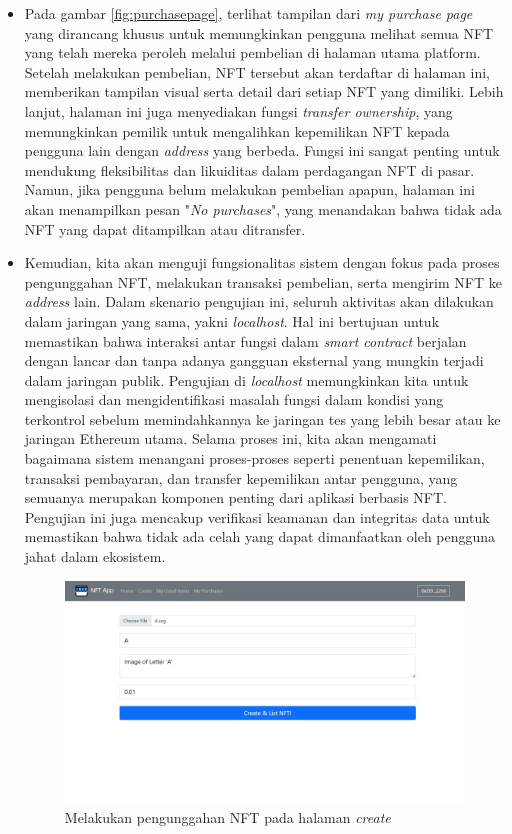 \begin{itemize}
        \item Pada gambar \ref{fig:purchasepage}, terlihat tampilan dari \emph{my purchase page} yang dirancang khusus untuk memungkinkan pengguna melihat semua NFT yang telah mereka peroleh melalui pembelian di halaman utama platform. Setelah melakukan pembelian, NFT tersebut akan terdaftar di halaman ini, memberikan tampilan visual serta detail dari setiap NFT yang dimiliki. Lebih lanjut, halaman ini juga menyediakan fungsi \emph{transfer ownership}, yang memungkinkan pemilik untuk mengalihkan kepemilikan NFT kepada pengguna lain dengan \emph{address} yang berbeda. Fungsi ini sangat penting untuk mendukung fleksibilitas dan likuiditas dalam perdagangan NFT di pasar. Namun, jika pengguna belum melakukan pembelian apapun, halaman ini akan menampilkan pesan "\emph{No purchases}", yang menandakan bahwa tidak ada NFT yang dapat ditampilkan atau ditransfer.
        
        \item Kemudian, kita akan menguji fungsionalitas sistem dengan fokus pada proses pengunggahan NFT, melakukan transaksi pembelian, serta mengirim NFT ke \emph{address} lain. Dalam skenario pengujian ini, seluruh aktivitas akan dilakukan dalam jaringan yang sama, yakni \emph{localhost}. Hal ini bertujuan untuk memastikan bahwa interaksi antar fungsi dalam \emph{smart contract} berjalan dengan lancar dan tanpa adanya gangguan eksternal yang mungkin terjadi dalam jaringan publik. Pengujian di \emph{localhost} memungkinkan kita untuk mengisolasi dan mengidentifikasi masalah fungsi dalam kondisi yang terkontrol sebelum memindahkannya ke jaringan tes yang lebih besar atau ke jaringan Ethereum utama. Selama proses ini, kita akan mengamati bagaimana sistem menangani proses-proses seperti penentuan kepemilikan, transaksi pembayaran, dan transfer kepemilikan antar pengguna, yang semuanya merupakan komponen penting dari aplikasi berbasis NFT. Pengujian ini juga mencakup verifikasi keamanan dan integritas data untuk memastikan bahwa tidak ada celah yang dapat dimanfaatkan oleh pengguna jahat dalam ekosistem.
      
      \begin{figure} [H] \centering
        \includegraphics[scale=0.27]{gambar/create_nft.jpg}
        \caption{Melakukan pengunggahan NFT pada halaman \emph{create}}
        \label{fig:createnft}
        \end{figure}


\end{itemize}
